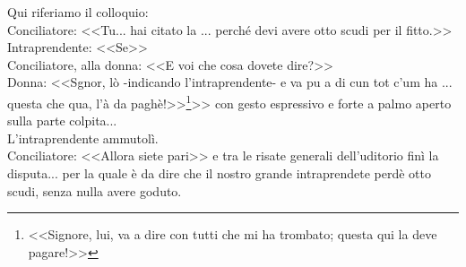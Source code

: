 \indent Qui riferiamo il colloquio:\\
\indent Conciliatore: <<Tu... hai citato la .\:.\:. perché devi avere otto scudi per il fitto.>>\\
\indent Intraprendente: <<Se>>\\
\indent Conciliatore, alla donna: <<E voi che cosa dovete dire?>>\\
\indent Donna: <<Sgnor, lò -indicando l'intraprendente- e va pu a di cun tot c'um ha .\:.\:. questa che qua, l'à da paghè!>>\footnote{<<Signore, lui, va a dire con tutti che mi ha trombato; questa qui la deve pagare!>>}>> con gesto espressivo e forte a palmo aperto sulla parte colpita...\\
\indent L'intraprendente ammutolì.\\
\indent Conciliatore: <<Allora siete pari>> e tra le risate generali dell'uditorio finì la disputa... per la quale è da dire che il nostro grande intraprendete perdè otto scudi, senza nulla avere goduto. 



